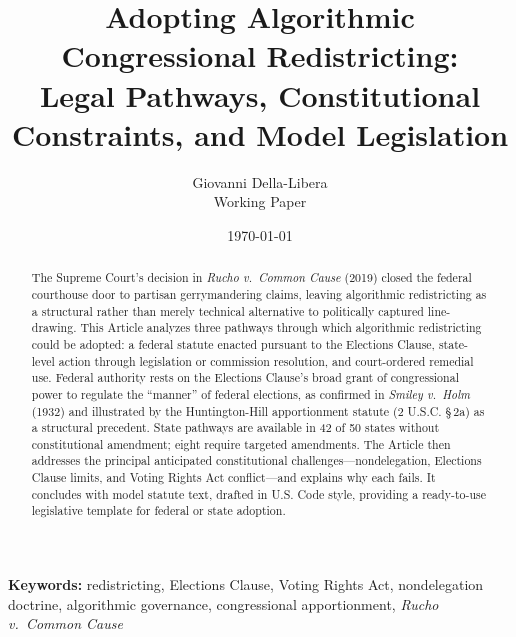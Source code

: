 \documentclass[12pt]{article}
\title{Adopting Algorithmic Congressional Redistricting:\\
Legal Pathways, Constitutional Constraints, and Model Legislation}
\author{
Giovanni Della-Libera\\
\small{Working Paper}
}
\date{\today}
\begin{document}
\maketitle

\begin{abstract}
The Supreme Court's decision in \textit{Rucho v.\ Common Cause} (2019) closed the federal courthouse door to partisan gerrymandering claims, leaving algorithmic redistricting as a structural rather than merely technical alternative to politically captured line-drawing. This Article analyzes three pathways through which algorithmic redistricting could be adopted: a federal statute enacted pursuant to the Elections Clause, state-level action through legislation or commission resolution, and court-ordered remedial use. Federal authority rests on the Elections Clause's broad grant of congressional power to regulate the ``manner'' of federal elections, as confirmed in \textit{Smiley v.\ Holm} (1932) and illustrated by the Huntington-Hill apportionment statute (2 U.S.C. \S\,2a) as a structural precedent. State pathways are available in 42 of 50 states without constitutional amendment; eight require targeted amendments. The Article then addresses the principal anticipated constitutional challenges---nondelegation, Elections Clause limits, and Voting Rights Act conflict---and explains why each fails. It concludes with model statute text, drafted in U.S. Code style, providing a ready-to-use legislative template for federal or state adoption.
\end{abstract}

\noindent\textbf{Keywords:} redistricting, Elections Clause, Voting Rights Act, nondelegation doctrine, algorithmic governance, congressional apportionment, \textit{Rucho v.\ Common Cause}












\end{document}
